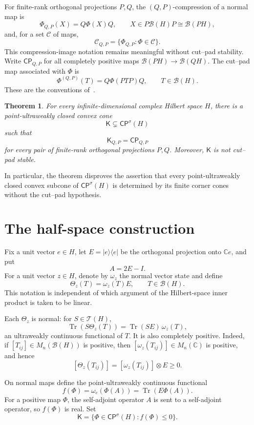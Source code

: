 \documentclass[11pt]{article}
\newtheorem{theorem}{Theorem}
\newcommand{\B}{\mathcal B}
\newcommand{\T}{\mathcal T}
\newcommand{\CP}{\mathsf{CP}}
\newcommand{\Kcone}{\mathsf K}
\newcommand{\Tr}{\operatorname{Tr}}
\begin{document}
For finite-rank orthogonal projections $P,Q$, the $(Q,P)$-compression of a
normal map is
\[
 \Phi_{Q,P}(X)=Q\Phi(X)Q,
 \qquad X\in P\B(H)P\cong\B(PH),
\]
and, for a set $\mathcal C$ of maps,
\[
 \mathcal C_{Q,P}=\{\Phi_{Q,P}:\Phi\in\mathcal C\}.
\]
This compression-image notation remains meaningful without cut--pad
stability.  Write $\CP_{Q,P}$ for all completely positive maps
$\B(PH)\to\B(QH)$.  The cut--pad map associated with $\Phi$ is
\[
 \Phi^{(Q,P)}(T)=Q\Phi(PTP)Q,
 \qquad T\in\B(H).
\]
These are the conventions of~\cite[Definitions~3.1 and 3.3,
Remark~5.4]{KianKittaneh2026}.

\begin{theorem}\label{thm:main}
For every infinite-dimensional complex Hilbert space $H$, there is a
point-ultraweakly closed convex cone
\[
  \Kcone\subsetneq\CP^\sigma(H)
\]
such that
\[
  \Kcone_{Q,P}=\CP_{Q,P}
\]
for every pair of finite-rank orthogonal projections $P,Q$.  Moreover,
$\Kcone$ is not cut--pad stable.
\end{theorem}

In particular, the theorem disproves the assertion that every
point-ultraweakly closed convex subcone of $\CP^\sigma(H)$ is determined by
its finite corner cones without the cut--pad hypothesis.

\section{The half-space construction}

Fix a unit vector $e\in H$, let $E=|e\rangle\langle e|$ be the orthogonal
projection onto $\mathbb Ce$, and put
\[
 A=2E-I.
\]
For a unit vector $z\in H$, denote by $\omega_z$ the normal vector state and
define
\[
 \Theta_z(T)=\omega_z(T)E,
 \qquad T\in\B(H).
\]
This notation is independent of which argument of the Hilbert-space inner
product is taken to be linear.

Each $\Theta_z$ is normal: for $S\in\T(H)$,
\[
 \Tr(S\Theta_z(T))=\Tr(SE)\,\omega_z(T),
\]
an ultraweakly continuous functional of $T$.  It is also completely positive.
Indeed, if $[T_{ij}]\in M_n(\B(H))$ is positive, then
$[\omega_z(T_{ij})]\in M_n(\mathbb C)$ is positive, and hence
\[
 [\Theta_z(T_{ij})]=[\omega_z(T_{ij})]\otimes E\geq0.
\]

On normal maps define the point-ultraweakly continuous functional
\[
 f(\Phi)=\omega_e(\Phi(A))=\Tr(E\Phi(A)).
\]
For a positive map $\Phi$, the self-adjoint operator $A$ is sent to a
self-adjoint operator, so $f(\Phi)$ is real.  Set
\begin{equation}\label{eq:cone}
 \Kcone=\{\Phi\in\CP^\sigma(H): f(\Phi)\leq0\}.
\end{equation}
\end{document}
